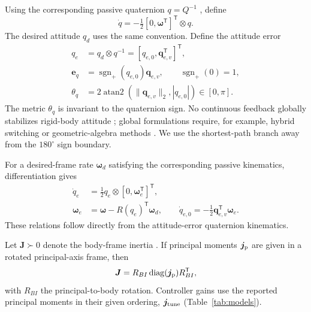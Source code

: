 \documentclass[letterpaper, 10 pt, conference]{ieeeconf}
\newcommand{\T}{^{\mathsf T}}
\newcommand{\sgnp}{\operatorname{sgn}_{+}}
\begin{document}
Using the corresponding passive quaternion $q=Q^{-1}$ \cite{diebel2006quaternion}, define
\begin{equation}
 \dot q=-\tfrac12[0,\bm\omega\T]\T\otimes q.
 \label{eq:passive}
\end{equation}
The desired attitude $q_d$ uses the same convention. Define the attitude error
\begin{align}
 q_e&=q_d\otimes q^{-1}=[q_{e,0},\bm q_{e,v}\T]\T,\\
 \bm e_q&=\sgnp(q_{e,0})\bm q_{e,v},\qquad \sgnp(0)=1,\\
 \theta_q&=2\operatorname{atan2}(\|\bm q_{e,v}\|_2,|q_{e,0}|)
             \in[0,\pi].
 \label{eq:theta}
\end{align}
The metric $\theta_q$ is invariant to the quaternion sign. No continuous feedback globally stabilizes rigid-body attitude \cite{chaturvedi2011rigid}; global formulations require, for example, hybrid switching \cite{mayhew2011hybrid} or geometric-algebra methods \cite{rubioscola2026ga}. We use the shortest-path branch away from the $180^\circ$ sign boundary.

For a desired-frame rate $\bm\omega_d$ satisfying the corresponding passive kinematics, differentiation gives
\begin{align}
 \dot q_e&=\tfrac12q_e\otimes[0,\bm\omega_e\T]\T,\\
 \bm\omega_e&=\bm\omega-R(q_e)\T\bm\omega_d,\qquad
 \dot q_{e,0}=-\tfrac12\bm q_{e,v}\T\bm\omega_e.
 \label{eq:errkin}
\end{align}
These relations follow directly from the attitude-error quaternion kinematics. 

Let $\bm J\succ0$ denote the body-frame inertia \cite{schaub2018amss}. If principal moments $\bm j_{\rm p}$ are given in a rotated principal-axis frame, then
\begin{equation}
 \bm J=R_{BI}\operatorname{diag}(\bm j_{\rm p})R_{BI}\T,
 \label{eq:inertiaframe}
\end{equation}
with $R_{BI}$ the principal-to-body rotation. Controller gains use the reported principal moments in their given ordering, $\bm j_{\rm tune}$ (Table~\ref{tab:models}).
\end{document}
